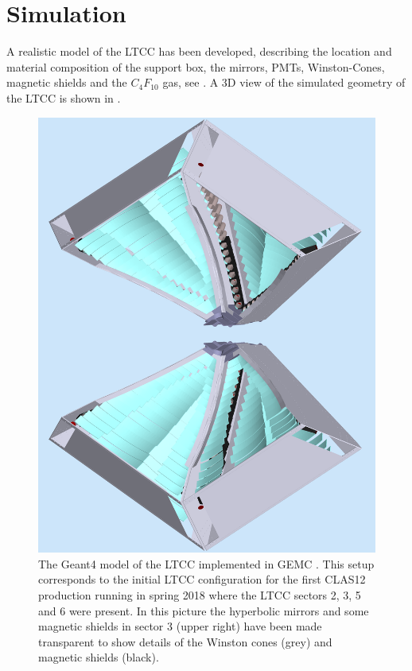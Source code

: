 \section{Simulation}

A realistic model of the LTCC has been developed, describing the location and material composition
of the support box, the mirrors, PMTs, Winston-Cones, magnetic shields and the $C_4F_{10}$ gas, see \cite{sim-nim}.
A 3D view of the simulated geometry of the LTCC is shown in .


\begin{figure}
	\centering
	\includegraphics[width=0.99\columnwidth,keepaspectratio]{img/simOverview.png}
	\caption{The Geant4 model of the LTCC implemented in GEMC \cite{sim-nim}. This setup corresponds to the
             initial LTCC configuration for the first CLAS12 production running in spring 2018
			 where the LTCC sectors 2, 3, 5 and 6 were present. In this picture the hyperbolic mirrors and some magnetic shields
             in sector 3 (upper right) have been made transparent to show details of the Winston cones (grey) and magnetic shields (black).}
	\label{fig:simOverview}
\end{figure}

